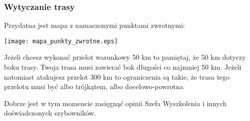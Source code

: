 \documentclass{article}
\begin{document}
\subsubsection{Wytyczanie trasy}
Przydatna jest mapa z zaznaczonymi punktami zwrotnymi:
\begin{center}
\texttt{[image: mapa\_punkty\_zwrotne.eps]}
\end{center}
Jeżeli chcesz wykonać przelot warunkowy 50 km to pamiętaj, że 50 km dotyczy
boku trasy. Twoja trasa musi zawierać bok długości co najmniej 50 km.
Jeżeli natomiast atakujesz przelot 300 km to ograniczenia są takie, że
trasa tego przelotu musi być albo trójkątem, albo docelowo-powrotna

Dobrze jest w tym momencie zasięgnąć opinii Szefa Wyszkolenia i innych
doświadczonych szybowników.

\newpage
\end{document}
